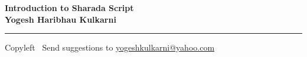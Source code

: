 
\usepackage{polyglossia}
\setdefaultlanguage{sanskrit}

\usepackage{fontspec}
\setmainfont{Segoe UI}

\newfontfamily{}
\newfontfamily{}
\newfontfamily{}
\newfontfamily{}


\newfontfamily{}

\graphicspath{{images/}}



\footnotesize


\begin{center}
\Large{\textbf{Introduction to Sharada Script\\ Yogesh Haribhau Kulkarni}}  
\end{center}

\begin{multicols}{2}

\end{multicols}

\rule{\linewidth}{0.25pt}
\scriptsize
Copyleft \textcopyleft\  Send suggestions to 
\href{http://www.yogeshkulkarni.com}{yogeshkulkarni@yahoo.com}


